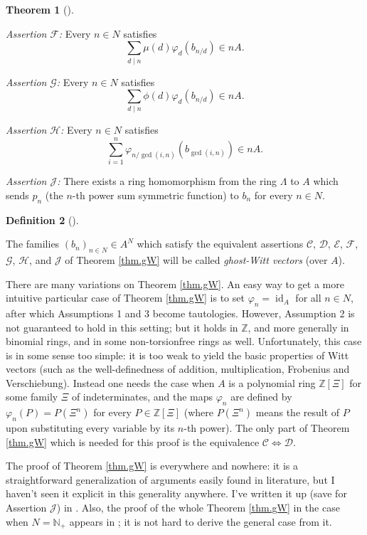 \documentclass[numbers=enddot,12pt,final,onecolumn,notitlepage]{scrartcl}%
\theoremstyle{definition}
\newtheorem{theo}{Theorem}[section]
\newenvironment{theorem}[1][]
{\begin{theo}[#1]\begin{leftbar}}
{\end{leftbar}\end{theo}}
\newtheorem{defi}[theo]{Definition}
\newenvironment{definition}[1][]
{\begin{defi}[#1]\begin{leftbar}}
{\end{leftbar}\end{defi}}
\let\sumnonlimits\sum
\renewcommand{\sum}{\sumnonlimits\limits}
\begin{document}
\begin{theorem}
\textit{Assertion }$\mathcal{F}$\textit{:} Every $n\in N$ satisfies%
\[
\sum_{d\mid n}\mu\left(  d\right)  \varphi_{d}\left(  b_{n / d}\right)  \in
nA.
\]


\textit{Assertion }$\mathcal{G}$\textit{:} Every $n\in N$ satisfies%
\[
\sum_{d\mid n}\phi\left(  d\right)  \varphi_{d}\left(  b_{n / d}\right)  \in
nA.
\]


\textit{Assertion }$\mathcal{H}$\textit{:} Every $n\in N$ satisfies%
\[
\sum_{i=1}^{n}\varphi_{n / \gcd\left(  i,n\right)  }\left(  b_{\gcd\left(
i,n\right)  }\right)  \in nA.
\]


\textit{Assertion $\mathcal{J}$:} There exists a ring homomorphism from the
ring $\Lambda$ to $A$ which sends $p_{n}$ (the $n$-th power sum symmetric
function) to $b_{n}$ for every $n\in N$.
\end{theorem}

\begin{definition}
The families $\left(  b_{n}\right)  _{n\in N}\in A^{N}$ which satisfy the
equivalent assertions $\mathcal{C}$, $\mathcal{D}$, $\mathcal{E}$,
$\mathcal{F}$, $\mathcal{G}$, $\mathcal{H}$, and $\mathcal{J}$ of Theorem
\ref{thm.gW} will be called \textit{ghost-Witt vectors} (over $A$).
\end{definition}

There are many variations on Theorem \ref{thm.gW}. An easy way to get a more
intuitive particular case of Theorem \ref{thm.gW} is to set $\varphi
_{n}=\operatorname*{id}\nolimits_{A}$ for all $n\in N$, after which
Assumptions 1 and 3 become tautologies. However, Assumption 2 is not
guaranteed to hold in this setting; but it holds in $\mathbb{Z}$, and more
generally in binomial rings, and in some non-torsionfree rings as well.
Unfortunately, this case is in some sense too simple: it is too weak to yield
the basic properties of Witt vectors (such as the well-definedness of
addition, multiplication, Frobenius and Verschiebung). Instead one needs the
case when $A$ is a polynomial ring $\mathbb{Z}\left[  \Xi\right]  $ for some
family $\Xi$ of indeterminates, and the maps $\varphi_{n}$ are defined by
$\varphi_{n}\left(  P\right)  =P\left(  \Xi^{n}\right)  $ for every
$P\in\mathbb{Z}\left[  \Xi\right]  $ (where $P\left(  \Xi^{n}\right)  $ means
the result of $P$ upon substituting every variable by its $n$-th power). The
only part of Theorem \ref{thm.gW} which is needed for this proof is the
equivalence $\mathcal{C}\Longleftrightarrow\mathcal{D}$.

The proof of Theorem \ref{thm.gW} is everywhere and nowhere: it is a
straightforward generalization of arguments easily found in literature, but I
haven't seen it explicit in this generality anywhere. I've written it up (save
for Assertion $\mathcal{J}$) in \cite[Theorem 11]{dg-witt5}. Also, the proof
of the whole Theorem \ref{thm.gW} in the case when $N=\mathbb{N}_{+}$ appears
in \cite[Exercise 2.9.6]{reiner-hopf}; it is not hard to derive the general
case from it.
\end{document}
